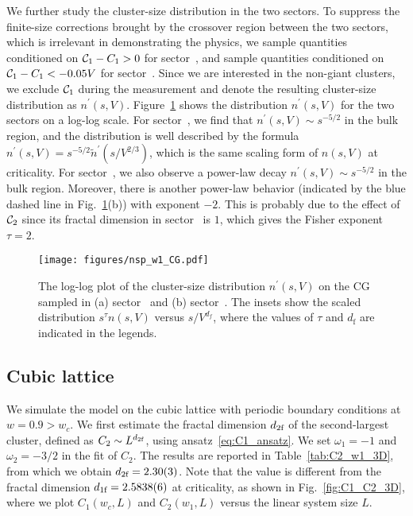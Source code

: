 We further study the cluster-size distribution in the two sectors. To suppress the finite-size corrections brought by
the crossover region between the two sectors, which is irrelevant in demonstrating the physics, we sample quantities conditioned on 
${\mathcal C}_1 - C_1 > 0$ for sector~, and sample quantities conditioned on ${\mathcal C}_1 - C_1 < -0.05V$ for sector~.
Since we are interested in the non-giant clusters, we exclude ${\mathcal C}_1$ during the measurement and denote the resulting
cluster-size distribution as $n^\prime(s, V)$. Figure~\ref{fig:nsp_w1_CG} shows the distribution $n^\prime(s, V)$ for the two sectors on a log-log scale.
For sector~, we find that $n^{\prime}(s, V)\sim s^{-5/2}$ in the bulk region, and the distribution is well described by the formula $n^\prime(s, V) = s^{-5/2} \tilde{n}^\prime(s/V^{2/3})$, 
which is the same scaling form of $n(s, V)$ at criticality. For sector~, we also observe a power-law decay $n^\prime(s, V)\sim s^{-5/2}$ in the bulk
region. Moreover, there is another power-law behavior (indicated by the blue dashed line in Fig.~\ref{fig:nsp_w1_CG}(b)) with exponent $-2$.
This is probably due to the effect of ${\mathcal C}_2$ since its fractal dimension in sector~ is $1$, which gives the Fisher exponent $\tau = 2$.

\begin{figure}[b]
	\centering
	\texttt{[image: figures/nsp\_w1\_CG.pdf]}
	\caption{The log-log plot of the cluster-size distribution $n^\prime(s, V)$ on the CG sampled in (a) sector~ and (b) sector~. The insets show
	the scaled distribution $s^\tau n(s, V)$ versus $s/V^{d_f}$, where the values of $\tau$ and $d_\text{f}$ are indicated in the legends.}
	\label{fig:nsp_w1_CG}
\end{figure}

\subsection{Cubic lattice}
We simulate the model on the cubic lattice with periodic boundary conditions at $w = 0.9  > w_c$. 
We first estimate the fractal dimension ${d_{2\textrm{f}}}$ of the second-largest cluster, defined as $C_2 \sim L^{{d_{2\textrm{f}}}}$, using ansatz~\eqref{eq:C1_ansatz}.
We set $\omega_1 = -1$ and $\omega_2 = -3/2$ in the fit of $C_2$. The results are reported in Table~\ref{tab:C2_w1_3D}, from which we
obtain ${d_{2\textrm{f}}} = 2.30(3)$. Note that the value is different from the fractal dimension ${d_{1\textrm{f}}} = 2.5838(6)$ at criticality,
as shown in Fig.~\ref{fig:C1_C2_3D}, where we plot $C_1(w_c, L)$ and $C_2(w_1, L)$ versus the linear system size $L$. 

